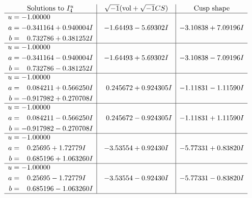 \documentclass[1p]{elsarticle_modified}
\theoremstyle{definition}
\newcommand{\I}{\sqrt{-1}}
\begin{document}
$$\begin{array}{c|c|c}  
\text{Solutions to }I^u_{4}& \I (\text{vol} + \sqrt{-1}CS) & \text{Cusp shape}\\
 \hline 
\begin{aligned}
u &= -1.00000\phantom{ +0.000000I} \\
a &= -0.341164 + 0.940004 I \\
b &= \phantom{-}0.732786 + 0.381252 I\end{aligned}
 & -1.64493 - 5.69302 I & -3.10838 + 7.09196 I \\ \hline\begin{aligned}
u &= -1.00000\phantom{ +0.000000I} \\
a &= -0.341164 - 0.940004 I \\
b &= \phantom{-}0.732786 - 0.381252 I\end{aligned}
 & -1.64493 + 5.69302 I & -3.10838 - 7.09196 I \\ \hline\begin{aligned}
u &= -1.00000\phantom{ +0.000000I} \\
a &= \phantom{-}0.084211 + 0.566250 I \\
b &= -0.917982 + 0.270708 I\end{aligned}
 & \phantom{-}0.245672 + 0.924305 I & -1.11831 - 1.11590 I \\ \hline\begin{aligned}
u &= -1.00000\phantom{ +0.000000I} \\
a &= \phantom{-}0.084211 - 0.566250 I \\
b &= -0.917982 - 0.270708 I\end{aligned}
 & \phantom{-}0.245672 - 0.924305 I & -1.11831 + 1.11590 I \\ \hline\begin{aligned}
u &= -1.00000\phantom{ +0.000000I} \\
a &= \phantom{-}0.25695 + 1.72779 I \\
b &= \phantom{-}0.685196 + 1.063260 I\end{aligned}
 & -3.53554 + 0.92430 I & -5.77331 + 0.83820 I \\ \hline\begin{aligned}
u &= -1.00000\phantom{ +0.000000I} \\
a &= \phantom{-}0.25695 - 1.72779 I \\
b &= \phantom{-}0.685196 - 1.063260 I\end{aligned}
 & -3.53554 - 0.92430 I & -5.77331 - 0.83820 I\\
 \hline 
 \end{array}$$\newpage
\end{document}

